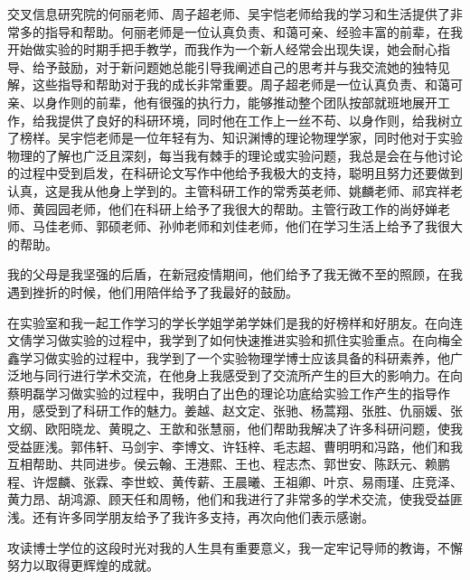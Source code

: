 \begin{acknowledgements}
  交叉信息研究院的何丽老师、周子超老师、吴宇恺老师给我的学习和生活提供了非常多的指导和帮助。何丽老师是一位认真负责、和蔼可亲、经验丰富的前辈，在我开始做实验的时期手把手教学，而我作为一个新人经常会出现失误，她会耐心指导、给予鼓励，对于新问题她总能引导我阐述自己的思考并与我交流她的独特见解，这些指导和帮助对于我的成长非常重要。周子超老师是一位认真负责、和蔼可亲、以身作则的前辈，他有很强的执行力，能够推动整个团队按部就班地展开工作，给我提供了良好的科研环境，同时他在工作上一丝不苟、以身作则，给我树立了榜样。吴宇恺老师是一位年轻有为、知识渊博的理论物理学家，同时他对于实验物理的了解也广泛且深刻，每当我有棘手的理论或实验问题，我总是会在与他讨论的过程中受到启发，在科研论文写作中他给予我极大的支持，聪明且努力还要做到认真，这是我从他身上学到的。主管科研工作的常秀英老师、姚麟老师、祁宾祥老师、黄园园老师，他们在科研上给予了我很大的帮助。主管行政工作的尚妤婵老师、马佳老师、郭硕老师、孙帅老师和刘佳老师，他们在学习生活上给予了我很大的帮助。

  我的父母是我坚强的后盾，在新冠疫情期间，他们给予了我无微不至的照顾，在我遇到挫折的时候，他们用陪伴给予了我最好的鼓励。

  在实验室和我一起工作学习的学长学姐学弟学妹们是我的好榜样和好朋友。在向连文倩学习做实验的过程中，我学到了如何快速推进实验和抓住实验重点。在向梅全鑫学习做实验的过程中，我学到了一个实验物理学博士应该具备的科研素养，他广泛地与同行进行学术交流，在他身上我感受到了交流所产生的巨大的影响力。在向蔡明磊学习做实验的过程中，我明白了出色的理论功底给实验工作产生的指导作用，感受到了科研工作的魅力。姜越、赵文定、张驰、杨蒿翔、张胜、仇丽媛、张文纲、欧阳晓龙、黄晛之、王歆和张慧丽，他们帮助我解决了许多科研问题，使我受益匪浅。郭伟轩、马剑宇、李博文、许钰梓、毛志超、曹明明和冯路，他们和我互相帮助、共同进步。侯云翰、王港熙、王也、程志杰、郭世安、陈跃元、赖鹏程、许煜麟、张霖、李世蛟、黄传薪、王晨曦、王祖卿、叶京、易雨瑾、庄竞泽、黄力昂、胡鸿源、顾天任和周畅，他们和我进行了非常多的学术交流，使我受益匪浅。还有许多同学朋友给予了我许多支持，再次向他们表示感谢。

  攻读博士学位的这段时光对我的人生具有重要意义，我一定牢记导师的教诲，不懈努力以取得更辉煌的成就。


\end{acknowledgements}
